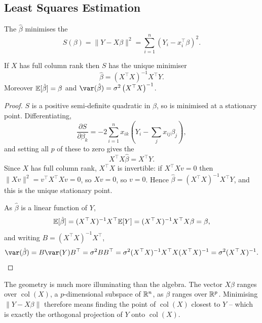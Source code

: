 \documentclass[a4paper]{scrartcl}
\newcommand{\col}{\operatorname{col}}
\begin{document}
\subsection{Least Squares Estimation}

\begin{definition}
  The  $\hat\beta$ minimises the 
  $$
  S(\beta) = \|Y - X\beta\|^2 = \sum_{i=1}^{n}\left(Y_i - x_i^\top\beta\right)^2.
  $$
\end{definition}

\begin{proposition}
  If $X$ has full column rank then $S$ has the unique minimiser
  $$
  \hat\beta = \left(X^\top X\right)^{-1}X^\top Y.
  $$
  Moreover $\mathbb{E}[\hat\beta] = \beta$ and $\var(\hat\beta) = \sigma^2\left(X^\top X\right)^{-1}$.
\end{proposition}
\begin{proof}
  $S$ is a positive semi-definite quadratic in $\beta$, so is minimised at a stationary point. Differentiating,
  $$
  \frac{\partial S}{\partial\beta_k} = -2\sum_{i=1}^{n}x_{ik}\left(Y_i - \sum_j x_{ij}\beta_j\right),
  $$
  and setting all $p$ of these to zero gives the 
  $$
  X^\top X\hat\beta = X^\top Y.
  $$
  Since $X$ has full column rank, $X^\top X$ is invertible: if $X^\top X v = 0$ then $\|Xv\|^2 = v^\top X^\top X v = 0$, so $Xv = 0$, so $v = 0$. Hence $\hat\beta = (X^\top X)^{-1}X^\top Y$, and this is the unique stationary point.

  As $\hat\beta$ is a linear function of $Y$,
  $$
  \mathbb{E}[\hat\beta] = (X^\top X)^{-1}X^\top\mathbb{E}[Y] = (X^\top X)^{-1}X^\top X\beta = \beta,
  $$
  and writing $B = (X^\top X)^{-1}X^\top$,
  $$
  \var(\hat\beta) = B\var(Y)B^\top = \sigma^2 B B^\top = \sigma^2(X^\top X)^{-1}X^\top X (X^\top X)^{-1} = \sigma^2(X^\top X)^{-1}. \qedhere
  $$
\end{proof}

The geometry is much more illuminating than the algebra. The vector $X\beta$ ranges over $\col(X)$, a $p$-dimensional subspace of $\mathbb{R}^n$, as $\beta$ ranges over $\mathbb{R}^p$. Minimising $\|Y - X\beta\|$ therefore means finding the point of $\col(X)$ closest to $Y$ -- which is exactly the orthogonal projection of $Y$ onto $\col(X)$.
\end{document}
